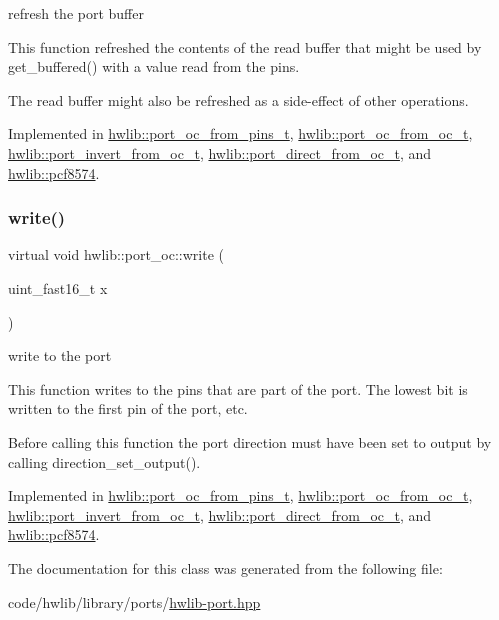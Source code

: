 refresh the port buffer

This function refreshed the contents of the read buffer that might be used by get\+\_\+buffered() with a value read from the pins.

The read buffer might also be refreshed as a side-\/effect of other operations. 

Implemented in \hyperlink{classhwlib_1_1port__oc__from__pins__t_ad60c497bf92c66a9243cb933db663837}{hwlib\+::port\+\_\+oc\+\_\+from\+\_\+pins\+\_\+t}, \hyperlink{classhwlib_1_1port__oc__from__oc__t_af7012c357f07fba115da4c0486d1e1d8}{hwlib\+::port\+\_\+oc\+\_\+from\+\_\+oc\+\_\+t}, \hyperlink{classhwlib_1_1port__invert__from__oc__t_a72a8110fbfc6115c279e9340869420d7}{hwlib\+::port\+\_\+invert\+\_\+from\+\_\+oc\+\_\+t}, \hyperlink{classhwlib_1_1port__direct__from__oc__t_a9144abbeca4e68f016bbfea05395d039}{hwlib\+::port\+\_\+direct\+\_\+from\+\_\+oc\+\_\+t}, and \hyperlink{classhwlib_1_1pcf8574_a6a82756c72f3f2599914cec45c8ed900}{hwlib\+::pcf8574}.

\mbox{\label{classhwlib_1_1port__oc_aa5889aedda709f045730db9859e4fcf4}} 
\subsubsection{\texorpdfstring{write()}{write()}}
{\footnotesize\ttfamily virtual void hwlib\+::port\+\_\+oc\+::write (\begin{DoxyParamCaption}\item[{uint\+\_\+fast16\+\_\+t}]{x }\end{DoxyParamCaption})\hspace{0.3cm}{\ttfamily [pure virtual]}}





write to the port

This function writes to the pins that are part of the port. The lowest bit is written to the first pin of the port, etc.

Before calling this function the port direction must have been set to output by calling direction\+\_\+set\+\_\+output(). 

Implemented in \hyperlink{classhwlib_1_1port__oc__from__pins__t_af1ad5780f01e5c09d9797e69d9b35523}{hwlib\+::port\+\_\+oc\+\_\+from\+\_\+pins\+\_\+t}, \hyperlink{classhwlib_1_1port__oc__from__oc__t_aa3bd2d7f8e302b54a4246866d8c593b7}{hwlib\+::port\+\_\+oc\+\_\+from\+\_\+oc\+\_\+t}, \hyperlink{classhwlib_1_1port__invert__from__oc__t_a7c59288ec311931116f47f88dfd1d1f0}{hwlib\+::port\+\_\+invert\+\_\+from\+\_\+oc\+\_\+t}, \hyperlink{classhwlib_1_1port__direct__from__oc__t_ab420ae508634aa891cb699f1e9972616}{hwlib\+::port\+\_\+direct\+\_\+from\+\_\+oc\+\_\+t}, and \hyperlink{classhwlib_1_1pcf8574_a19abea394995fc9aa2fa628c263421fa}{hwlib\+::pcf8574}.



The documentation for this class was generated from the following file\+:\begin{DoxyCompactItemize}
\item 
code/hwlib/library/ports/\hyperlink{hwlib-port_8hpp}{hwlib-\/port.\+hpp}\end{DoxyCompactItemize}
